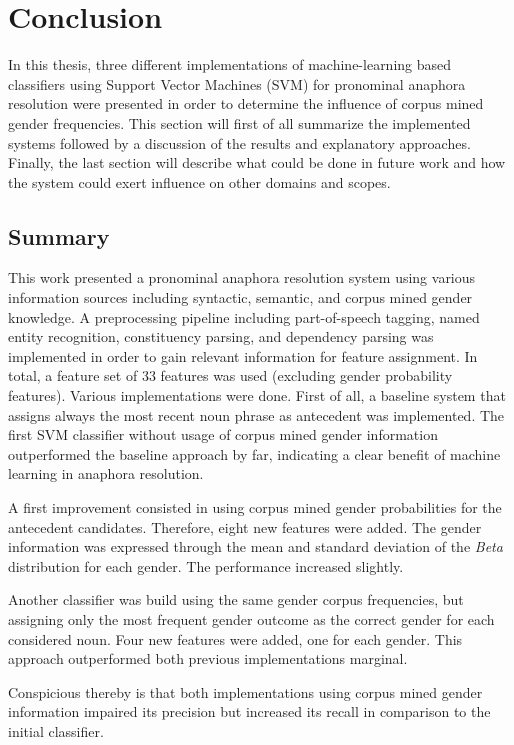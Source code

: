 \chapter{Conclusion}
\label{sec:Conclusion}
In this thesis, three different implementations of machine-learning based classifiers using Support Vector Machines (SVM) for pronominal anaphora resolution were presented in order to determine the influence of corpus mined gender frequencies. This section will first of all summarize the implemented systems followed by a discussion of the results and explanatory approaches. Finally, the last section will describe what could be done in future work and how the system could exert influence on other domains and scopes.

\section{Summary}
This work presented a pronominal anaphora resolution system using various information sources including syntactic, semantic, and corpus mined gender knowledge. A preprocessing pipeline including part-of-speech tagging, named entity recognition, constituency parsing, and dependency parsing was implemented in order to gain relevant information for feature assignment. In total, a feature set of 33 features was used (excluding gender probability features). Various implementations were done. First of all, a baseline system that assigns always the most recent noun phrase as antecedent was implemented. The first SVM classifier without usage of corpus mined gender information outperformed the baseline approach by far, indicating a clear benefit of machine learning in anaphora resolution. 

A first improvement consisted in using corpus mined gender probabilities for the antecedent candidates. Therefore, eight new features were added. The gender information was expressed through the mean and standard deviation of the \textit{Beta} distribution for each gender. The performance increased slightly. 

Another classifier was build using the same gender corpus frequencies, but assigning only the most frequent gender outcome as the correct gender for each considered noun. Four new features were added, one for each gender. This approach outperformed both previous implementations marginal.

Conspicious thereby is that both implementations using corpus mined gender information impaired its precision but increased its recall in comparison to the initial classifier. 


